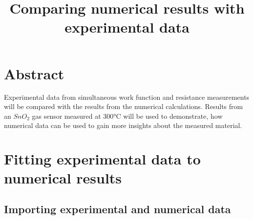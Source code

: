 \documentclass[11pt]{article}
\title{Comparing numerical results with experimental data}
\begin{document}
    
    \maketitle
    
    

    
    \setcounter{page}{87}
\tableofcontents 
\setcounter{section}{0}

    \hypertarget{abstract}{%
\section{Abstract}\label{abstract}}

Experimental data from simultaneous work function and resistance
measurements will be compared with the results from the numerical
calculations. Results from an \(SnO_2\) gas sensor measured at 300°C
will be used to demonstrate, how numerical data can be used to gain more
insights about the measured material.

    \hypertarget{fitting-experimental-data-to-numerical-results}{%
\section{Fitting experimental data to numerical
results}\label{fitting-experimental-data-to-numerical-results}}

\hypertarget{importing-experimental-and-numerical-data}{%
\subsection{Importing experimental and numerical
data}\label{importing-experimental-and-numerical-data}}
\end{document}
